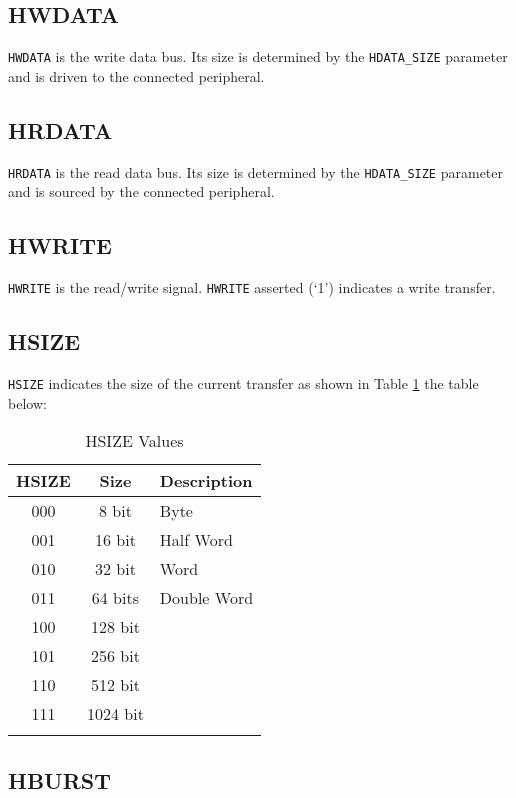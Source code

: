 \subsection{HWDATA}

\texttt{HWDATA} is the write data bus. Its size is determined by the
\texttt{HDATA\_SIZE} parameter and is driven to the connected
peripheral.

\subsection{HRDATA}

\texttt{HRDATA} is the read data bus. Its size is determined by the
\texttt{HDATA\_SIZE} parameter and is sourced by the connected
peripheral.

\subsection{HWRITE}

\texttt{HWRITE} is the read/write signal. \texttt{HWRITE} asserted (`1')
indicates a write transfer.

\subsection{HSIZE}

\texttt{HSIZE} indicates the size of the current transfer as shown in
\ifdefined\MARKDOWN
Table \ref{tab:HSIZE}
\else
the table below:
\fi

\begin{longtable}[c]{@{\extracolsep{\fill}}ccl}	
		\toprule 
		\textbf{HSIZE} & \textbf{Size} & \textbf{Description}\\
		\midrule
		\endhead 
		000 & 8 bit & Byte\\
		001 & 16 bit & Half Word\\
		010 & 32 bit & Word\\
		011 & 64 bits & Double Word\\
		100 & 128 bit &\\
		101 & 256 bit &\\
		110 & 512 bit &\\
		111 & 1024 bit &\\
		\bottomrule 	
	\caption{HSIZE Values}
	\label{tab:HSIZE}
\end{longtable}

\subsection{HBURST}

